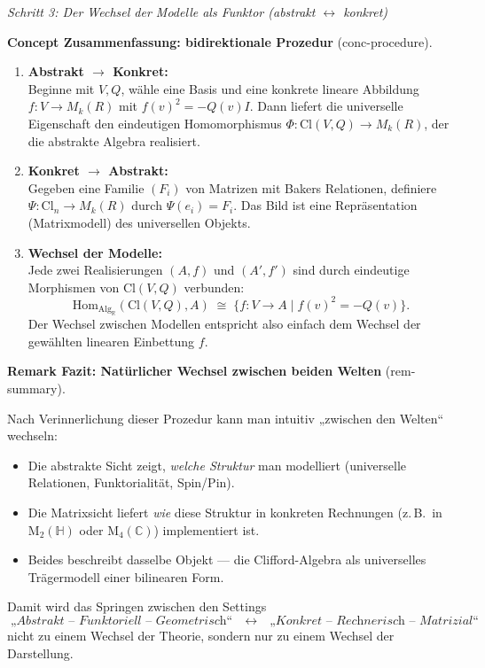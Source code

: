 \documentclass[10pt, letterpaper]{article}
\newcommand{\R}{\mathbb{R}}
\newcommand{\C}{\mathbb{C}}
\newcommand{\Alg}{\mathrm{Alg}}
\newcommand{\Hom}{\mathrm{Hom}}
\newcommand{\Cl}{\mathrm{Cl}}
\newcommand{\CustomHeading}[3]{%
  \par\medskip\noindent%
  \textbf{#1 #2} \textnormal{(#3)}.\enskip%
}
\newenvironment{REM}[2]{\begin{unitbox}\CustomHeading{Remark}{#1}{#2}}{\end{unitbox}}
\newenvironment{CONC}[2]{\begin{unitbox}\CustomHeading{Concept}{#1}{#2}}{\end{unitbox}}
\begin{document}
\emph{Schritt 3: Der Wechsel der Modelle als Funktor (abstrakt $\leftrightarrow$ konkret)}

\begin{CONC}{Zusammenfassung: bidirektionale Prozedur}{conc-procedure}
\begin{center}
\end{center}
\begin{enumerate}[leftmargin=*]
\item \textbf{Abstrakt $\to$ Konkret:}\\
  Beginne mit $V,Q$, wähle eine Basis und eine konkrete lineare Abbildung
  $f:V\to M_k(R)$ mit $f(v)^2=-Q(v)I$.  
  Dann liefert die universelle Eigenschaft den eindeutigen Homomorphismus
  $\Phi:\Cl(V,Q)\to M_k(R)$, der die abstrakte Algebra realisiert.

\item \textbf{Konkret $\to$ Abstrakt:}\\
  Gegeben eine Familie $(F_i)$ von Matrizen mit Bakers Relationen,
  definiere $\Psi:\Cl_n\to M_k(R)$ durch $\Psi(e_i)=F_i$.  
  Das Bild ist eine Repräsentation (Matrixmodell) des universellen Objekts.

\item \textbf{Wechsel der Modelle:}\\
  Jede zwei Realisierungen $(A,f)$ und $(A',f')$ sind durch eindeutige
  Morphismen von $\Cl(V,Q)$ verbunden:
  \[
  \Hom_{\Alg_\R}(\Cl(V,Q),A)\;\cong\;
  \{f:V\to A\mid f(v)^2=-Q(v)\}.
  \]
  Der Wechsel zwischen Modellen entspricht also einfach dem Wechsel
  der gewählten linearen Einbettung $f$.
\end{enumerate}
\end{CONC}

\begin{REM}{Fazit: Natürlicher Wechsel zwischen beiden Welten}{rem-summary}
Nach Verinnerlichung dieser Prozedur kann man intuitiv
„zwischen den Welten“ wechseln:
\begin{itemize}[leftmargin=*]
\item Die abstrakte Sicht zeigt, \emph{welche Struktur} man modelliert
  (universelle Relationen, Funktorialität, Spin/Pin).
\item Die Matrixsicht liefert \emph{wie} diese Struktur in konkreten Rechnungen
  (z.\,B.\ in $\mathrm{M}_2(\mathbb{H})$ oder $\mathrm{M}_4(\C)$) implementiert ist.
\item Beides beschreibt dasselbe Objekt — die Clifford-Algebra
  als universelles Trägermodell einer bilinearen Form.
\end{itemize}
Damit wird das Springen zwischen den Settings
\[
\textit{„Abstrakt – Funktoriell – Geometrisch“}\quad\longleftrightarrow\quad
\textit{„Konkret – Rechnerisch – Matrizial“}
\]
nicht zu einem Wechsel der Theorie, sondern nur zu einem Wechsel der Darstellung.
\end{REM}
\end{document}
